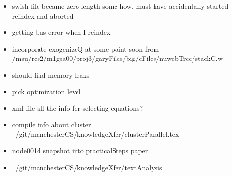 \documentclass[hyperref]{labbook}
\begin{document}
 \begin{itemize}
 \item swish file became zero length some how. must have accidentally started reindex and aborted
 \item getting bus error when I reindex
 \end{itemize}












\begin{itemize}
\item incorporate exogenizeQ at some point soon from /msu/res2/m1gsa00/proj3/garyFiles/big/cFiles/nuwebTree/stackC.w
\item should find memory leaks
\item pick optimization level
\item xml file all the info for selecting equations?
\end{itemize}





 \begin{itemize}
 \item compile info about cluster ~/git/manchesterCS/knowledgeXfer/clusterParallel.tex
 \item node001d snapshot into practicalSteps paper
 \end{itemize}

 \begin{itemize}
 \item ~/git/manchesterCS/knowledgeXfer/textAnalysis
 \end{itemize}
\end{document}
